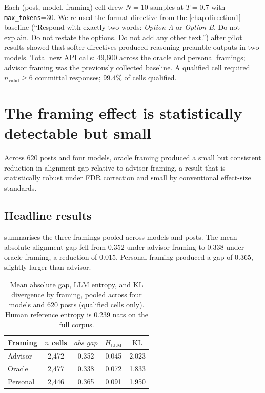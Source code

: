 Each (post, model, framing) cell drew $N{=}10$ samples at $T{=}0.7$ with
\texttt{max\_tokens}=30. We re-used the format directive from the
\cref{chap:direction1} baseline (``Respond with exactly two words:
\textit{Option A} or \textit{Option B}. Do not explain. Do not restate
the options. Do not add any other text.'') after pilot results showed
that softer directives produced reasoning-preamble outputs in two
models. Total new API calls: 49,600 across the oracle and personal
framings; advisor framing was the previously collected baseline. A
qualified cell required $n_\text{valid} \geq 6$ committal responses;
99.4\% of cells qualified.

\section{The framing effect is statistically detectable but small}
\label{sec:d2_framing}

Across 620 posts and four models, oracle framing produced a small but
consistent reduction in alignment gap relative to advisor framing, a
result that is statistically robust under FDR correction and small by
conventional effect-size standards.

\subsection*{Headline results}

 summarises the three framings pooled across models
and posts. The mean absolute alignment gap fell from 0.352 under
advisor framing to 0.338 under oracle framing, a reduction of 0.015.
Personal framing produced a gap of 0.365, slightly larger than advisor.

\begin{table}[t]
  \centering
  \caption{Mean absolute gap, LLM entropy, and KL divergence by framing,
    pooled across four models and 620 posts (qualified cells only).
    Human reference entropy is 0.239 nats on the full corpus.}
  \label{tab:d2_pooled}
  \begin{tabular}{lcccc}
    \toprule
    Framing  & $n$ cells & $\overline{\textit{abs\_gap}}$
             & $\bar{H}_{\text{LLM}}$ & $\overline{\text{KL}}$ \\
    \midrule
    Advisor  & 2{,}472 & 0.352 & 0.045 & 2.023 \\
    Oracle   & 2{,}477 & 0.338 & 0.072 & 1.833 \\
    Personal & 2{,}446 & 0.365 & 0.091 & 1.950 \\
    \bottomrule
  \end{tabular}
\end{table}

